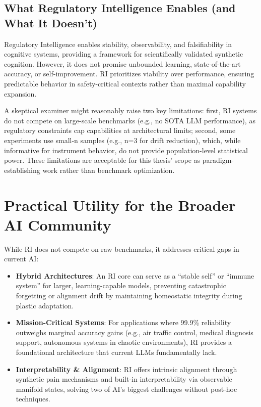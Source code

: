 \documentclass[12pt,a4paper]{report}
\begin{document}
\subsection{What Regulatory Intelligence Enables (and What It Doesn't)}

Regulatory Intelligence enables stability, observability, and falsifiability in cognitive systems, providing a framework for scientifically validated synthetic cognition. However, it does not promise unbounded learning, state-of-the-art accuracy, or self-improvement. RI prioritizes viability over performance, ensuring predictable behavior in safety-critical contexts rather than maximal capability expansion.

A skeptical examiner might reasonably raise two key limitations: first, RI systems do not compete on large-scale benchmarks (e.g., no SOTA LLM performance), as regulatory constraints cap capabilities at architectural limits; second, some experiments use small-n samples (e.g., n=3 for drift reduction), which, while informative for instrument behavior, do not provide population-level statistical power. These limitations are acceptable for this thesis' scope as paradigm-establishing work rather than benchmark optimization.

\section{Practical Utility for the Broader AI Community}

While RI does not compete on raw benchmarks, it addresses critical gaps in current AI:

\begin{itemize}
    \item \textbf{Hybrid Architectures}: An RI core can serve as a “stable self” or “immune system” for larger, learning-capable models, preventing catastrophic forgetting or alignment drift by maintaining homeostatic integrity during plastic adaptation.

    \item \textbf{Mission-Critical Systems}: For applications where 99.9\% reliability outweighs marginal accuracy gains (e.g., air traffic control, medical diagnosis support, autonomous systems in chaotic environments), RI provides a foundational architecture that current LLMs fundamentally lack.

    \item \textbf{Interpretability \& Alignment}: RI offers intrinsic alignment through synthetic pain mechanisms and built-in interpretability via observable manifold states, solving two of AI's biggest challenges without post-hoc techniques.
\end{itemize}
\end{document}
